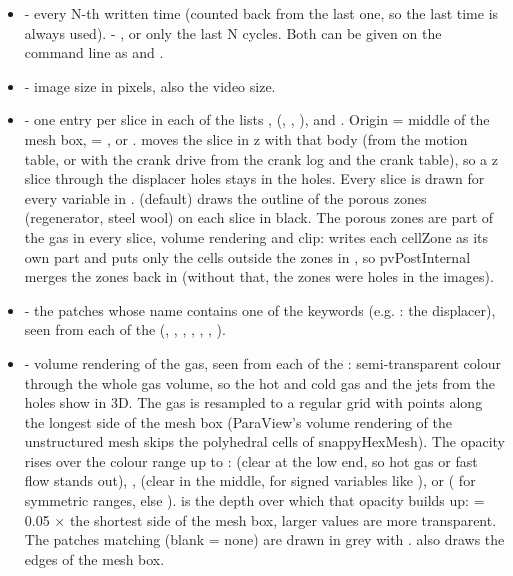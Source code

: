 \begin{itemize}
    \item {} - every N-th written time (counted back from the last one, so the last time is always used).  - , or only the last N cycles. Both can be given on the command line as  and .
    \item {} - image size in pixels, also the video size.
    \item \codeword{[SLICE]} - one entry per slice in each of the lists ,  (, , ),  and . Origin  = middle of the mesh box,  = , or .  moves the slice in z with that body (from the motion table, or with the crank drive from the crank log and the crank table), so a z slice through the displacer holes stays in the holes. Every slice is drawn for every variable in .  (default) draws the outline of the porous zones (regenerator, steel wool) on each slice in black. The porous zones are part of the gas in every slice, volume rendering and clip:  writes each cellZone as its own part and puts only the cells outside the zones in , so pvPostInternal merges the zones back in (without that, the zones were holes in the images).
    \item \codeword{[SURFACE]} - the patches whose name contains one of the  keywords (e.g. : the displacer), seen from each of the  (, , , , , , ).
    \item \codeword{[VOLUME]} - volume rendering of the gas, seen from each of the : semi-transparent colour through the whole gas volume, so the hot and cold gas and the jets from the holes show in 3D. The gas is resampled to a regular grid with  points along the longest side of the mesh box (ParaView's volume rendering of the unstructured mesh skips the polyhedral cells of snappyHexMesh). The opacity rises over the colour range up to :   (clear at the low end, so hot gas or fast flow stands out), ,  (clear in the middle, for signed variables like ), or  ( for symmetric ranges, else ).  is the depth over which that opacity builds up:  = 0.05 $\times$ the shortest side of the mesh box, larger values are more transparent. The patches matching  (blank = none) are drawn in grey with .  also draws the edges of the mesh box.

\end{itemize}
